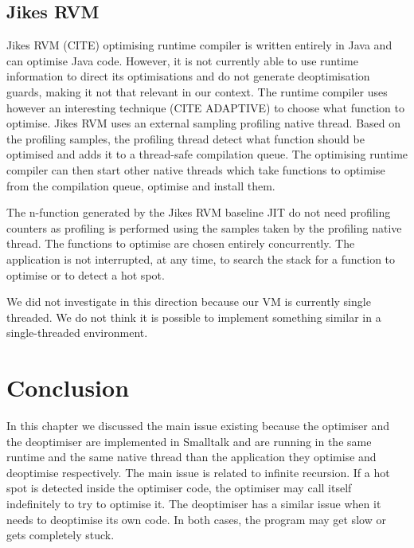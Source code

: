 \documentclass[a4paper,12pt,twoside]{../includes/ThesisStyle}
\begin{document}
\subsection{Jikes RVM}

Jikes RVM (CITE) optimising runtime compiler is written entirely in Java and can optimise Java code. However, it is not currently able to use runtime information to direct its optimisations and do not generate deoptimisation guards, making it not that relevant in our context. The runtime compiler uses however an interesting technique (CITE ADAPTIVE) to choose what function to optimise. Jikes RVM uses an external sampling profiling native thread. Based on the profiling samples, the profiling thread detect what function should be optimised and adds it to a thread-safe compilation queue. The optimising runtime compiler can then start other native threads which take functions to optimise from the compilation queue, optimise and install them. 

The n-function generated by the Jikes RVM baseline JIT do not need profiling counters as profiling is performed using the samples taken by the profiling native thread. The functions to optimise are chosen entirely concurrently. The application is not interrupted, at any time, to search the stack for a function to optimise or to detect a hot spot.

We did not investigate in this direction because our VM is currently single threaded. We do not think it is possible to implement something similar in a single-threaded environment.


\section{Conclusion}

In this chapter we discussed the main issue existing because the optimiser and the deoptimiser are implemented in Smalltalk and are running in the same runtime and the same native thread than the application they optimise and deoptimise respectively. The main issue is related to infinite recursion. If a hot spot is detected inside the optimiser code, the optimiser may call itself indefinitely to try to optimise it. The deoptimiser has a similar issue when it needs to deoptimise its own code. In both cases, the program may get slow or gets completely stuck.
\end{document}
